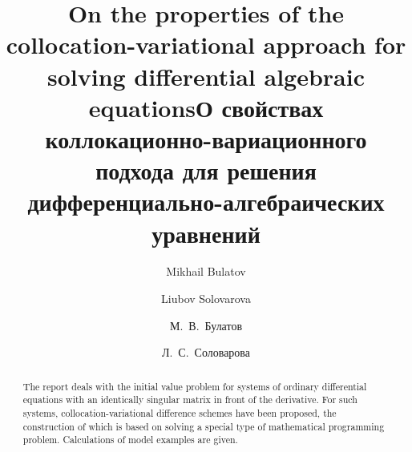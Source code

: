 \begin{englishtitle} %
\title{On the properties of the collocation-variational approach for solving differential algebraic equations}
\author{Mikhail Bulatov
  \and
  Liubov Solovarova
	}
  


\maketitle

\begin{abstract}
The report deals with the initial value problem for systems of ordinary differential equations with an identically singular matrix in front of the derivative. For such systems, collocation-variational difference schemes have been proposed, the construction of which is based on solving a special type of mathematical programming problem. Calculations of model examples are given.

\end{abstract}
\end{englishtitle}

\iffalse

%
%


\documentclass[12pt]{llncs}  


\usepackage{iftex}

\ifPDFTeX
\usepackage[T2A]{fontenc}
\usepackage[utf8]{inputenc} %
\usepackage[english,russian]{babel}
\fi

\usepackage{todonotes} 

\usepackage[russian]{nla}


\fi

\title{О свойствах коллокационно-вариационного подхода для решения дифференциально-алгебраических уравнений}
\author{М.~В.~Булатов  
  \and  
  Л.~С.~Соловарова
}

